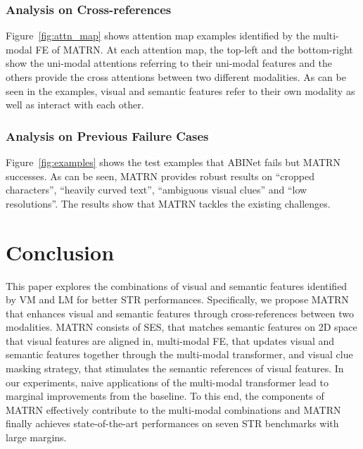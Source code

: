 \documentclass[runningheads]{llncs}
\begin{document}
\subsubsection{Analysis on Cross-references}

Figure~\ref{fig:attn_map} shows attention map examples identified by the multi-modal FE of MATRN. At each attention map, the top-left and the bottom-right show the uni-modal attentions referring to their uni-modal features and the others provide the cross attentions between two different modalities. As can be seen in the examples, visual and semantic features refer to their own modality as well as interact with each other. 

\subsubsection{Analysis on Previous Failure Cases}

Figure~\ref{fig:examples} shows the test examples that ABINet fails but MATRN successes. As can be seen, MATRN provides robust results on ``cropped characters'', ``heavily curved text'', ``ambiguous visual clues'' and ``low resolutions''. The results show that MATRN tackles the existing challenges.

\section{Conclusion}

This paper explores the combinations of visual and semantic features identified by VM and LM for better STR performances. 
Specifically, we propose MATRN that enhances visual and semantic features through cross-references between two modalities.
MATRN consists of SES, that matches semantic features on 2D space that visual features are aligned in, multi-modal FE, that updates visual and semantic features together through the multi-modal transformer, and visual clue masking strategy, that stimulates the semantic references of visual features. In our experiments, naive applications of the multi-modal transformer lead to marginal improvements from the baseline. To this end, the components of MATRN effectively contribute to the multi-modal combinations and MATRN finally achieves state-of-the-art performances on seven STR benchmarks with large margins.


\clearpage


\end{document}
